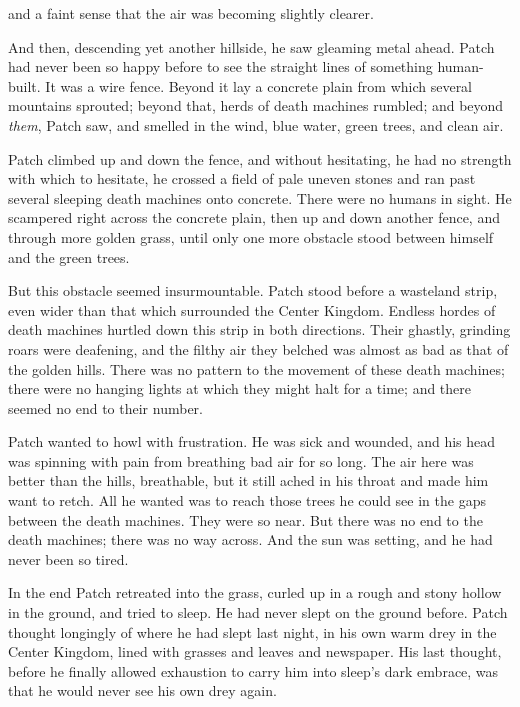 \documentclass[11pt]{article}
\begin{document}
 and a faint sense that the air was becoming slightly clearer.\par
And then, descending yet another hillside, he saw gleaming metal ahead. Patch had never been so happy before to see the straight lines of something human-built. It was a wire fence. Beyond it lay a concrete plain from which several mountains sprouted; beyond that, herds of death machines rumbled; and beyond {\it them}, Patch saw, and smelled in the wind, blue water, green trees, and clean air.\par
Patch climbed up and down the fence, and without hesitating, he had no strength with which to hesitate, he crossed a field of pale uneven stones and ran past several sleeping death machines onto concrete. There were no humans in sight. He scampered right across the concrete plain, then up and down another fence, and through more golden grass, until only one more obstacle stood between himself and the green trees.\par
But this obstacle seemed insurmountable. Patch stood before a wasteland strip, even wider than that which surrounded the Center Kingdom. Endless hordes of death machines hurtled down this strip in both directions. Their ghastly, grinding roars were deafening, and the filthy air they belched was almost as bad as that of the golden hills. There was no pattern to the movement of these death machines; there were no hanging lights at which they might halt for a time; and there seemed no end to their number.\par
 Patch wanted to howl with frustration. He was sick and wounded, and his head was spinning with pain from breathing bad air for so long. The air here was better than the hills, breathable, but it still ached in his throat and made him want to retch. All he wanted was to reach those trees he could see in the gaps between the death machines. They were so near. But there was no end to the death machines; there was no way across. And the sun was setting, and he had never been so tired.\par
 In the end Patch retreated into the grass, curled up in a rough and stony hollow in the ground, and tried to sleep. He had never slept on the ground before. Patch thought longingly of where he had slept last night, in his own warm drey in the Center Kingdom, lined with grasses and leaves and newspaper. His last thought, before he finally allowed exhaustion to carry him into sleep's dark embrace, was that he would never see his own drey again.\par
\par
\end{document}
